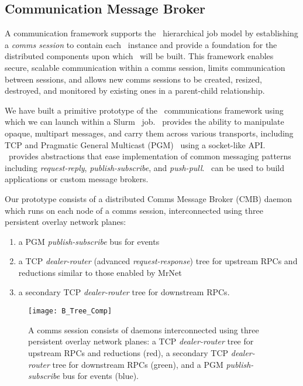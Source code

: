 \subsection{Communication Message Broker}

A communication framework supports the \flux\ hierarchical job model
by establishing a {\em comms session} to contain each \flux\ instance
and provide a foundation for the distributed components upon which
\flux\ will be built.
This framework enables secure, scalable communication
within a comms session, limits communication between sessions,
and allows new comms sessions to be created, resized, destroyed,
and monitored by existing ones in a parent-child relationship.

We have built a primitive prototype of the \flux\ communications framework
using \zMQ~\cite{ZMQGuide} which we can launch within a
Slurm~\cite{Jette02slurm} job.
\zMQ\ provides the ability to manipulate opaque,
multipart messages, and carry them across various transports, including
TCP and Pragmatic General Multicast (PGM)~\cite{rfc3208}
using a socket-like API.
\zMQ\ provides abstractions that ease implementation of common
messaging patterns including {\em request-reply}, {\em publish-subscribe},
and {\em push-pull}.
\zMQ\ can be used to build applications or custom message brokers.

Our prototype consists of a distributed Comms Message Broker (CMB)
daemon which runs on each node of a comms session, interconnected using
three persistent overlay network planes:
\begin{enumerate}
\item{a PGM {\em publish-subscribe} bus for events}
\item{a TCP {\em dealer-router} (advanced {\em request-response})
tree for upstream RPCs and reductions
similar to those enabled by MrNet~\cite{mrnet}}
\item{a secondary TCP {\em dealer-router} tree for downstream RPCs.}
\end{enumerate}

\begin{figure}
\centering
\texttt{[image: B\_Tree\_Comp]}
\caption{A comms session consists of daemons interconnected using
three persistent overlay network planes:
a TCP {\em dealer-router} tree for upstream RPCs and reductions (red),
a secondary TCP {\em dealer-router} tree for downstream RPCs (green), and
a PGM {\em publish-subscribe} bus for events (blue).}
\label{fig:commswireup}
\end{figure}

